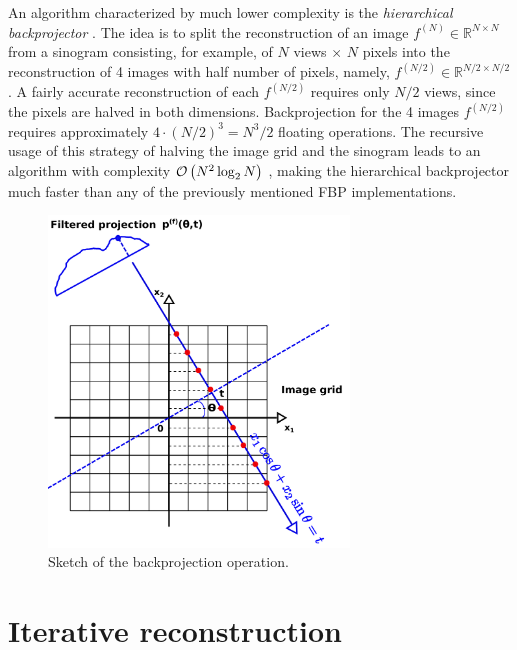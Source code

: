 {\newline
An algorithm characterized by much lower complexity is the \emph{hierarchical backprojector} \cite{Basu2000}.
The idea is to split the reconstruction of an image $f^{(N)} \in \mathbb{R}^{N\times N}$ from a sinogram consisting,
for example, of $N$ views $\times$ $N$ pixels
into the reconstruction of 4 images with half number of pixels, namely, $f^{(N/2)} \in \mathbb{R}^{N/2\times N/2}$. 
A fairly accurate reconstruction of each $f^{(N/2)}$ requires only $N/2$ views, since the pixels are halved in both dimensions.
Backprojection for the 4 images $f^{(N/2)}$ requires approximately $4 \cdot (N/2)^{3} = N^{3}/2$ floating operations.
The recursive usage of this strategy of halving the image grid and the sinogram leads to an algorithm with complexity 
$\operatorname{\mathcal{O}}\left(N^{2}\log_{2}N\right)$ \cite{Basu2000}, making the hierarchical backprojector much faster than any of the 
previously mentioned FBP implementations. 

\begin{figure}[!t]
    \centering
    \includegraphics[width=8cm]{images/introduction_fbp_backprojection.pdf}   
   \caption[Sketch of the backprojection operation.]{Sketch of the backprojection operation.}
    \label{introduction:fbp:backprojection} 
\end{figure}



\section{Iterative reconstruction}
}
